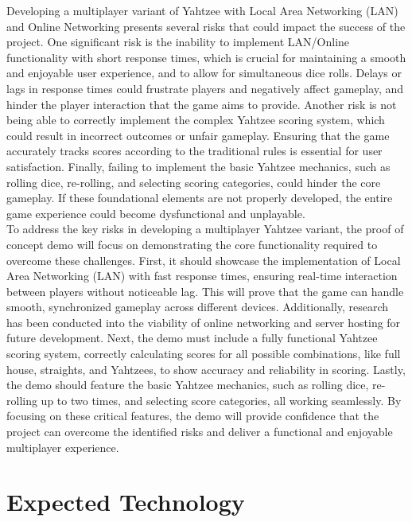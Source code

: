 \documentclass{article}
\begin{document}
Developing a multiplayer variant of Yahtzee with Local Area Networking (LAN) and Online Networking presents several risks that could impact the success of the project. One significant risk is the inability to implement LAN/Online functionality with short response times, which is crucial for maintaining a smooth and enjoyable user experience, and to allow for simultaneous dice rolls. Delays or lags in response times could frustrate players and negatively affect gameplay, and hinder the player interaction that the game aims to provide. Another risk is not being able to correctly implement the complex Yahtzee scoring system, which could result in incorrect outcomes or unfair gameplay. Ensuring that the game accurately tracks scores according to the traditional rules is essential for user satisfaction. Finally, failing to implement the basic Yahtzee mechanics, such as rolling dice, re-rolling, and selecting scoring categories, could hinder the core gameplay. If these foundational elements are not properly developed, the entire game experience could become dysfunctional and unplayable.\\

To address the key risks in developing a multiplayer Yahtzee variant, the proof of concept demo will focus on demonstrating the core functionality required to overcome these challenges. First, it should showcase the implementation of Local Area Networking (LAN) with fast response times, ensuring real-time interaction between players without noticeable lag. This will prove that the game can handle smooth, synchronized gameplay across different devices. Additionally, research has been conducted into the viability of online networking and server hosting for future development. Next, the demo must include a fully functional Yahtzee scoring system, correctly calculating scores for all possible combinations, like full house, straights, and Yahtzees, to show accuracy and reliability in scoring. Lastly, the demo should feature the basic Yahtzee mechanics, such as rolling dice, re-rolling up to two times, and selecting score categories, all working seamlessly. By focusing on these critical features, the demo will provide confidence that the project can overcome the identified risks and deliver a functional and enjoyable multiplayer experience.\\


\section{Expected Technology}
\end{document}
